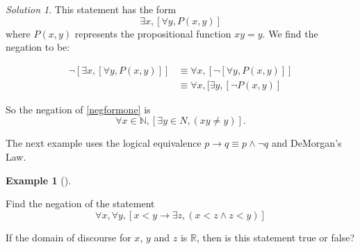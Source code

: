 \documentclass[
  letterpaper,
  10pt,
  reqno,
  twopage,
  openany]{book}
\theoremstyle{plain}
\theoremstyle{definition}
\theoremstyle{definition}
\theoremstyle{definition}
\newtheorem{example}{Example}[chapter]
\theoremstyle{plain}
\theoremstyle{plain}
\theoremstyle{remark}
\newtheorem*{solution}{Solution}
\begin{document}
\begin{solution}

This statement has the form \[
\exists x, [\forall y, P(x,y)]
\] where \(P(x,y)\) represents the propositional function \(xy=y\). We
find the negation to be:

\begin{align*}
\neg [\exists x, [\forall y, P(x,y)]]
& \equiv \forall x, [\neg [\forall y, P(x,y)]]  \\
& \equiv \forall x, [\exists y, [\neg P(x,y)]
\end{align*}

So the negation of \eqref{negformone} is \begin{equation*}
\forall x\in \mathbb{N}, [\exists y\in N, (xy\neq y)].
\end{equation*}

\end{solution}

The next example uses the logical equivalence
\(p\rightarrow q \equiv p\land \neg q\) and DeMorgan's Law.

\leavevmode{}%
\begin{example}[]\label{exm-nq-3}

Find the negation of the statement \begin{equation}
\label{negformonea}
\forall x, \forall y, [ x < y \rightarrow \exists z, (x < z \land z < y) ]
\end{equation}

\end{example}

If the domain of discourse for \(x\), \(y\) and \(z\) is \(\mathbb{R}\),
then is this statement true or false?
\end{document}
